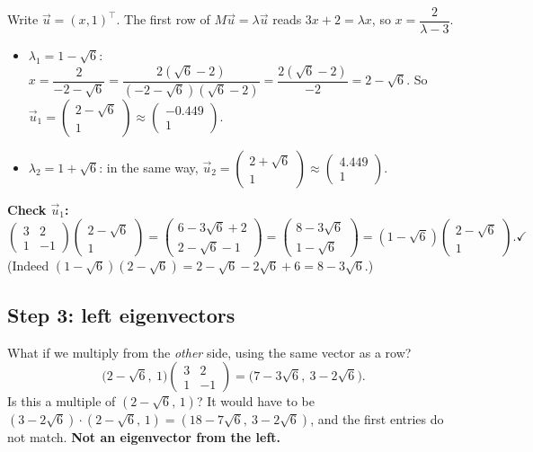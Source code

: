 Write $\vec u = (x,1)^\top$. The first row of $M\vec u=\lambda\vec u$ reads $3x + 2 = \lambda x$, so $x = \dfrac{2}{\lambda-3}$.
\begin{itemize}
  \item $\lambda_1 = 1-\sqrt6$: $x = \dfrac{2}{-2-\sqrt6} = \dfrac{2(\sqrt6-2)}{(-2-\sqrt6)(\sqrt6-2)} = \dfrac{2(\sqrt6-2)}{-2} = 2-\sqrt6$.
        So $\vec u_1 = \begin{pmatrix}2-\sqrt6\\1\end{pmatrix}\approx\begin{pmatrix}-0.449\\1\end{pmatrix}$.
  \item $\lambda_2 = 1+\sqrt6$: in the same way, $\vec u_2 = \begin{pmatrix}2+\sqrt6\\1\end{pmatrix}\approx\begin{pmatrix}4.449\\1\end{pmatrix}$.
\end{itemize}

\textbf{Check $\vec u_1$:}
\[ \begin{pmatrix}3&2\\1&-1\end{pmatrix}\begin{pmatrix}2-\sqrt6\\1\end{pmatrix}
= \begin{pmatrix}6-3\sqrt6+2\\ 2-\sqrt6-1\end{pmatrix} = \begin{pmatrix}8-3\sqrt6\\ 1-\sqrt6\end{pmatrix}
= (1-\sqrt6)\begin{pmatrix}2-\sqrt6\\1\end{pmatrix}. \checkmark \]
(Indeed $(1-\sqrt6)(2-\sqrt6) = 2-\sqrt6-2\sqrt6+6 = 8-3\sqrt6$.)

\subsection{Step 3: left eigenvectors}

What if we multiply from the \emph{other} side, using the same vector as a row?
\[ \big(2-\sqrt6,\ 1\big)\begin{pmatrix}3&2\\1&-1\end{pmatrix} = \big(7-3\sqrt6,\ 3-2\sqrt6\big). \]
Is this a multiple of $(2-\sqrt6,\,1)$? It would have to be $(3-2\sqrt6)\cdot(2-\sqrt6,\,1) = (18-7\sqrt6,\ 3-2\sqrt6)$, and the first entries do not match. \textbf{Not an eigenvector from the left.}

